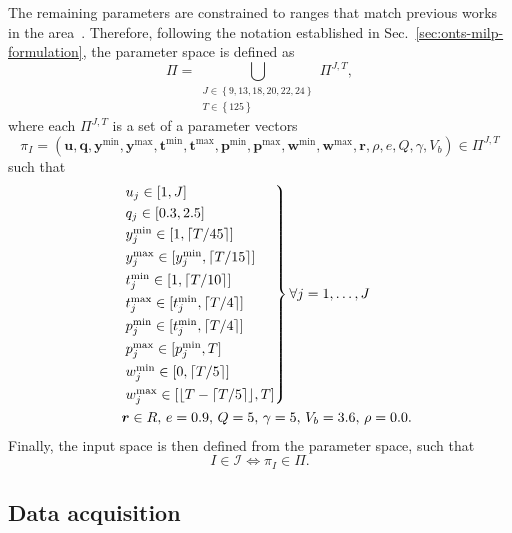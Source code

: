 The remaining parameters are constrained to ranges that match previous works in the area~\cite{rigoBranchandpriceAlgorithmNanosatellite2022,semanEnergyAwareTaskScheduling2022,rigoTaskSchedulingOptimal2021}.
Therefore, following the notation established in Sec.~\ref{sec:onts-milp-formulation}, the parameter space is defined as
\begin{equation}\label{eq:parameter-space}
\Pi = \bigcup_{\substack{J \in \left\{ 9,13,18,20,22,24 \right\} \\ T \in \left\{ 125 \right\} }} \Pi^{J,T}
,\end{equation}
where each $\Pi^{J,T}$ is a set of a parameter vectors \[
\pi_I= \left( \bm{u}, \bm{q}, \bm{y}^{\min}, \bm{y}^{\max}, \bm{t}^{\min}, \bm{t}^{\max}, \bm{p}^{\min}, \bm{p}^{\max}, \bm{w}^{\min}, \bm{w}^{\max}, \bm{r}, \rho, e, Q, \gamma, V_b \right) \in \Pi^{J,T}
\] such that
\begin{equation*}
\begin{aligned}
&\begin{rcases}
    & u_j \in [1, J] \\
	 & q_j \in [0.3, 2.5] \\
    	 & y_j^{\min} \in [1, \lceil T/45 \rceil] \\
    	 & y_j^{\max} \in [y_j^{\min}, \lceil T/15 \rceil] \\
    	 & t_j^{\min} \in [1, \lceil T/10 \rceil] \\
    	 & t_j^{\max} \in [t_j^{\min}, \lceil T/4 \rceil] \\
    	 & p_j^{\min} \in [t_j^{\min}, \lceil T/4 \rceil] \\
    	 & p_j^{\max} \in [p_j^{\min}, T] \\
    	 & w_j^{\min} \in [0, \lceil T/5 \rceil] \\
    	 & w_j^{\max} \in [\lfloor T-\lceil T/5 \rceil \rfloor, T]
\end{rcases} \forall j =1,\ldots,J \\
    &\quad \bm{r} \in R ,\, e = 0.9 ,\, Q = 5 ,\, \gamma = 5 ,\, V_b = 3.6 ,\, \rho = 0.0
.\end{aligned}
\end{equation*}
Finally, the input space is then defined from the parameter space, such that \[
    I\in \mathcal{I} \iff \pi_I \in \Pi 
.\] 


\subsection{Data acquisition}\label{sec:data-acquisition}

